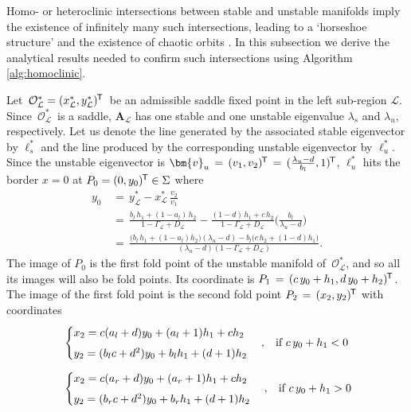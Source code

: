 \documentclass{article}
\theoremstyle{example}
\theoremstyle{plain}
\theoremstyle{definition}
\theoremstyle{remark}
\def\vv{{\bm{v}}}
\def\mA{{\bm{A}}}
\newcommand*{\tran}{^{\mkern-1.5mu\mathsf{T}}}
\begin{document}
Homo- or heteroclinic intersections between stable and unstable manifolds imply the existence of infinitely many such intersections, leading to a `horseshoe structure' and the existence of chaotic orbits \citep{wig}. In this subsection we derive the analytical results needed to confirm such intersections using Algorithm \ref{alg:homoclinic}.

Let $\, \mathcal{O}^{*}_{\mathcal{L}}=(x^{*}_{\mathcal{L}}, y^{*}_{\mathcal{L}})\tran\,$ be an admissible saddle fixed point in the left sub-region $\mathcal{L}$. Since $\, \mathcal{O}^{*}_{\mathcal{L}}\,$ is a saddle, $\mA_{\mathcal{L}}$ has one stable and one unstable eigenvalue $\lambda_{s}$ and $\lambda_{u}$, respectively. Let us denote the line generated by the associated stable eigenvector by $\boldsymbol\ell^{*}_{s}$ and the line produced by the corresponding unstable eigenvector by $\boldsymbol\ell^{*}_{u}$. Since the unstable eigenvector is $\vv_{u}\, = \,(v_1,v_2)\tran\,=\,(\frac{\lambda_{u}-d}{b_l},1)\tran$, $\boldsymbol\ell^{*}_{u}$ hits the border $x=0$ at $P_0=(0, y_0)\tran \in \Sigma$ where
    \begingroup
\allowdisplaybreaks
    \begin{align}\nonumber
     y_0 &\, = \, y^{*}_{\mathcal{L}} - x^{*}_{\mathcal{L}}\, \frac{v_2}{v_1}
     \\[1ex]\nonumber
& \, = \, \frac{b_{l}\, h_1 +(1-a_{l}) \, h_2}{1-\Gamma_{\mathcal{L}}+D_{\mathcal{L}}} - \frac{(1-d)\, h_1 + c \, h_2}{1-\Gamma_{\mathcal{L}}+D_{\mathcal{L}}}\Big( \frac{b_l}{\lambda_{u}-d}\Big)
     \\[1ex]\label{eq-y0}
     & \, = \, \frac{\big(b_l\,h_1 + (1-a_l)h_2\big)(\lambda_{u}-d)- b_l\big(c\,h_2 + (1 - d)h_1\big) }{(\lambda_{u}-d)(1-\Gamma_{\mathcal{L}}+D_{\mathcal{L}})}.   
    \end{align}
    \endgroup
The image of $P_0$ is the first fold point of the unstable manifold of $\,\mathcal{O}^{*}_{\mathcal{L}}$, and so all its images will also be fold points. Its coordinate is $P_1 \, = \, (c\, y_0+h_1, d\, y_0+h_2)\tran $. The image of the first fold point is the
second fold point $P_2 \, = \,(x_2, y_2)\tran$ with coordinates
\begin{align}\nonumber
& \begin{cases}
x_2 = c(a_l+d)y_0 + (a_l+1)h_1 +ch_2
\\[1ex]
y_2  =  (b_l c +d^2) y_0 + b_l h_1+ (d+1)h_2
\end{cases}, \hspace{.3cm} \text{if} \, \,  c\, y_0+h_1 <0
%
\\[1ex]
& \begin{cases}
x_2 = c(a_r+d)y_0 + (a_r+1)h_1 +ch_2
\\[1ex]
y_2  = (b_r c +d^2) y_0 + b_r h_1+ (d+1)h_2
\end{cases}, \hspace{.3cm} \text{if} \, \,  c\, y_0+h_1 > 0
\end{align}
\end{document}
